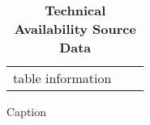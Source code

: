 \documentclass[10pt]{article}
\begin{document}
\begin{table}[!ht]
\caption{
\bf{Technical Availability Source Data}}
\begin{tabular}{|c|c|c|}
table information
\end{tabular}
\begin{flushleft}Caption
\end{flushleft}
\label{tab:}
 \end{table}

\end{document}
